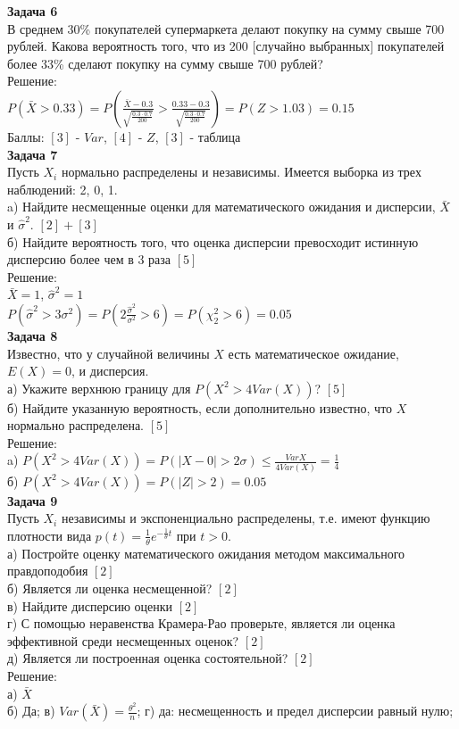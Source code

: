\documentclass[pdftex,12pt,a4paper]{article}
\begin{document}
\textbf{Задача 6} \\ %
В среднем 30\% покупателей супермаркета делают покупку на сумму
свыше 700 рублей. Какова вероятность того, что из 200 $[$случайно
выбранных$]$ покупателей
более 33\% сделают покупку на сумму свыше 700 рублей? \\
Решение: \\
$P(\bar{X}>0.33)=P\left(\frac{\bar{X}-0.3}{\sqrt{\frac{0.3\cdot
0.7}{200}}}>\frac{0.33-0.3}{\sqrt{\frac{0.3\cdot
0.7}{200}}}\right)=P(Z>1.03)=0.15$ \\
Баллы: $[3]$ - $Var$, $[4]$ - $Z$, $[3]$ - таблица \\


\textbf{Задача 7} \\ %
Пусть $X_{i}$ нормально распределены и
независимы. Имеется выборка
из трех наблюдений: 2, 0, 1. \\
a) Найдите несмещенные оценки для математического ожидания и
дисперсии, $\bar{X}$ и $\hat{\sigma}^{2}$. $[2]+[3]$\\
б) Найдите вероятность того, что оценка дисперсии превосходит
истинную дисперсию более чем в 3 раза $[5]$\\
Решение: \\
$\bar{X}=1$, $\hat{\sigma}^{2}=1$ \\
$P(\hat{\sigma}^{2}>3\sigma^{2})=P\left(2\frac{\hat{\sigma}^{2}}{\sigma^{2}}>6\right)=P(\chi_{2}^{2}>6)=0.05$
\\


\textbf{Задача 8} \\ %
Известно, что у случайной величины $X$ есть
математическое
ожидание, $E(X)=0$, и дисперсия. \\
а) Укажите верхнюю границу для $P(X^{2}>4Var(X))$? $[5]$\\
б) Найдите указанную вероятность, если дополнительно известно, что
$X$ нормально распределена. $[5]$\\
Решение: \\
a) $P(X^{2}>4Var(X))=P(|X-0|>2\sigma)\le
\frac{Var{X}}{4Var(X)}=\frac{1}{4}$ \\
б) $P(X^{2}>4Var(X))=P(|Z|>2)=0.05$ \\

\textbf{Задача 9} \\ %
Пусть $X_{i}$ независимы и экспоненциально
распределены, т.е. имеют функцию плотности вида
$p(t)=\frac{1}{\theta}e^{-\frac{1}{\theta}t}$ при $t>0$. \\
а) Постройте оценку математического ожидания методом максимального
правдоподобия $[2]$\\
б) Является ли оценка несмещенной? $[2]$\\
в) Найдите дисперсию оценки $[2]$\\
г) С помощью неравенства Крамера-Рао проверьте, является ли
оценка эффективной среди несмещенных оценок? $[2]$\\
д) Является ли построенная оценка состоятельной? $[2]$\\
Решение: \\
а) $\bar{X}$ \\
б) Да; в) $Var(\bar{X})=\frac{\theta^{2}}{n}$; г) да:
несмещенность и предел дисперсии равный нулю; \\
\end{document}
